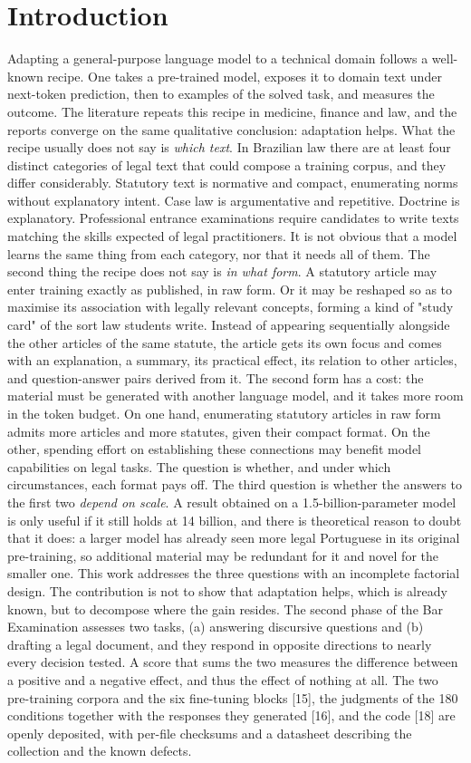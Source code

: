 \documentclass{IOS-Book-Article}
\begin{document}
\section{Introduction}
Adapting a general-purpose language model to a technical domain follows a well-known recipe. One takes a pre-trained model, exposes it to domain text under next-token prediction, then to examples of the solved task, and measures the outcome. The literature repeats this recipe in medicine, finance and law, and the reports converge on the same qualitative conclusion: adaptation helps.
What the recipe usually does not say is \emph{which text}. In Brazilian law there are at least four distinct categories of legal text that could compose a training corpus, and they differ considerably. Statutory text is normative and compact, enumerating norms without explanatory intent. Case law is argumentative and repetitive. Doctrine is explanatory. Professional entrance examinations require candidates to write texts matching the skills expected of legal practitioners. It is not obvious that a model learns the same thing from each category, nor that it needs all of them.
The second thing the recipe does not say is \emph{in what form}. A statutory article may enter training exactly as published, in raw form. Or it may be reshaped so as to maximise its association with legally relevant concepts, forming a kind of "study card" of the sort law students write. Instead of appearing sequentially alongside the other articles of the same statute, the article gets its own focus and comes with an explanation, a summary, its practical effect, its relation to other articles, and question-answer pairs derived from it. The second form has a cost: the material must be generated with another language model, and it takes more room in the token budget. On one hand, enumerating statutory articles in raw form admits more articles and more statutes, given their compact format. On the other, spending effort on establishing these connections may benefit model capabilities on legal tasks. The question is whether, and under which circumstances, each format pays off.
The third question is whether the answers to the first two \emph{depend on scale}. A result obtained on a 1.5-billion-parameter model is only useful if it still holds at 14 billion, and there is theoretical reason to doubt that it does: a larger model has already seen more legal Portuguese in its original pre-training, so additional material may be redundant for it and novel for the smaller one.
This work addresses the three questions with an incomplete factorial design. The contribution is not to show that adaptation helps, which is already known, but to decompose where the gain resides. The second phase of the Bar Examination assesses two tasks, (a) answering discursive questions and (b) drafting a legal document, and they respond in opposite directions to nearly every decision tested. A score that sums the two measures the difference between a positive and a negative effect, and thus the effect of nothing at all.
The two pre-training corpora and the six fine-tuning blocks [15], the judgments of the 180 conditions together with the responses they generated [16], and the code [18] are openly deposited, with per-file checksums and a datasheet describing the collection and the known defects.
\end{document}
